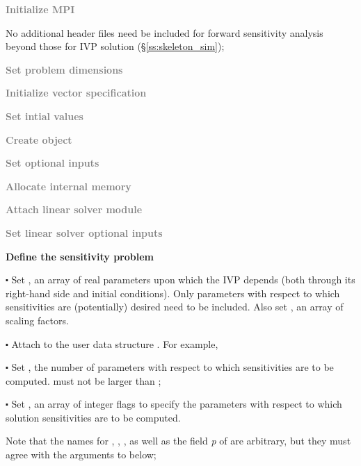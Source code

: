 \begin{Steps}
  
\item 
  \textcolor{gray}{\bf Initialize MPI}

  No additional header files need be included for forward sensitivity analysis 
  beyond those for IVP solution (\S\ref{ss:skeleton_sim});

\item
  \textcolor{gray}{\bf Set problem dimensions}

\item
  \textcolor{gray}{\bf Initialize vector specification}

\item
  \textcolor{gray}{\bf Set intial values}
 
\item
  \textcolor{gray}{\bf Create {\cvodes} object}

\item
  \textcolor{gray}{\bf Set optional inputs}

\item
  \textcolor{gray}{\bf Allocate internal memory}

\item
  \textcolor{gray}{\bf Attach linear solver module}

\item
  \textcolor{gray}{\bf Set linear solver optional inputs}

\item \label{i:fwd_start}
  {\bf Define the sensitivity problem}

  $\centerdot$ Set , an array of  real parameters upon which the IVP depends 
  (both through its right-hand side and initial conditions). Only parameters
  with respect to which sensitivities are (potentially) desired need to 
  be included. Also set , an array of  scaling factors.
  
  $\centerdot$ Attach  to the user data structure . 
  For example, 
  
  $\centerdot$ Set , the number of parameters with respect to which sensitivities
  are to be computed.  must not be larger than ;
  
  $\centerdot$ Set , an array of  integer flags to specify the parameters
   with respect to which solution sensitivities are to be computed.
  
  Note that the names for , , , as well as the field
  {\em p} of  are arbitrary, but they must agree with the arguments
  to  below;


\end{Steps}
